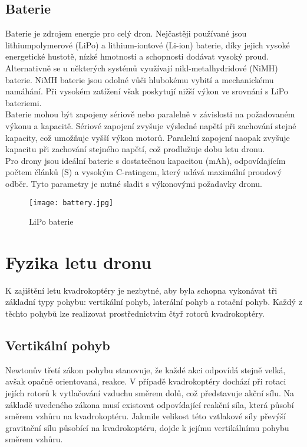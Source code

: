 \documentclass[12pt]{report}
\begin{document}
\section[Baterie]{Baterie}

Baterie je zdrojem energie pro celý dron. Nejčastěji používané jsou lithiumpolymerové (LiPo) a lithium-iontové (Li-ion) baterie, díky jejich vysoké energetické hustotě, nízké hmotnosti a schopnosti dodávat vysoký proud. Alternativně se u některých systémů využívají nikl-metalhydridové (NiMH) baterie. NiMH baterie jsou odolné vůči hlubokému vybití a mechanickému namáhání. Při vysokém zatížení však poskytují nižší výkon ve srovnání s LiPo bateriemi.\\
Baterie mohou být zapojeny sériově nebo paralelně v závislosti na požadovaném výkonu a kapacitě. Sériové zapojení zvyšuje výsledné napětí při zachování stejné kapacity, což umožňuje vyšší výkon motorů. Paralelní zapojení naopak zvyšuje kapacitu při zachování stejného napětí, což prodlužuje dobu letu dronu.\\
Pro drony jsou ideální baterie s dostatečnou kapacitou (mAh), odpovídajícím počtem článků (S) a vysokým C-ratingem, který udává maximální proudový odběr. Tyto parametry je nutné sladit s výkonovými požadavky dronu. \cite{mainbook}

\begin{figure}[H]
	\centering
	\texttt{[image: battery.jpg]}
	\caption{LiPo baterie \cite{dojo}}
	\label{fig:battery.jpg}
\end{figure}

\chapter[Fyzika letu dron]{Fyzika letu dronu}
K zajištění letu kvadrokoptéry je nezbytné, aby byla schopna vykonávat tři základní typy pohybu: vertikální pohyb, laterální pohyb a rotační pohyb. Každý z těchto pohybů lze realizovat prostřednictvím čtyř rotorů kvadrokoptéry.

\section[Vertikální pohyb]{Vertikální pohyb}
Newtonův třetí zákon pohybu stanovuje, že každé akci odpovídá stejně velká, avšak opačně orientovaná, reakce. V případě kvadrokoptéry dochází při rotaci jejích rotorů k vytlačování vzduchu směrem dolů, což představuje akční sílu. Na základě uvedeného zákona musí existovat odpovídající reakční síla, která působí směrem vzhůru na kvadrokoptéru. Jakmile velikost této vztlakové síly převýší gravitační sílu působící na kvadrokoptéru, dojde k jejímu vertikálnímu pohybu směrem vzhůru.
\end{document}
